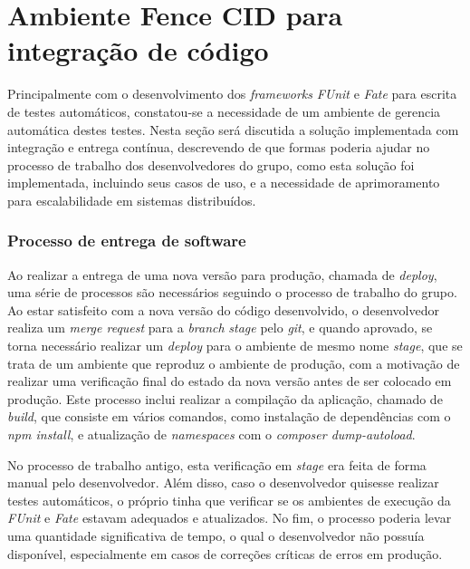 \hypertarget{fence-continuous-integration-delivery}{%
\section{Ambiente Fence CID para integração de código}\label{fence-continuous-integration-delivery}}

Principalmente com o desenvolvimento dos \emph{frameworks} \emph{FUnit} e \emph{Fate} para escrita de testes automáticos, constatou-se a necessidade de um ambiente de gerencia automática destes testes. Nesta seção será discutida a solução implementada com integração e entrega contínua, descrevendo de que formas poderia ajudar no processo de trabalho dos desenvolvedores do grupo, como esta solução foi implementada, incluindo seus casos de uso, e a necessidade de aprimoramento para escalabilidade em sistemas distribuídos.

\hypertarget{processo-de-entrega-de-software}{%
\subsubsection{\texorpdfstring{Processo de entrega de software}{Processo de entrega de software}}\label{processo-de-entrega-de-software}}

Ao realizar a entrega de uma nova versão para produção, chamada de \emph{deploy}, uma série de processos são necessários seguindo o processo de trabalho do grupo. Ao estar satisfeito com a nova versão do código desenvolvido, o desenvolvedor realiza um \emph{merge request} para a \emph{branch} \emph{stage} pelo \emph{git}, e quando aprovado, se torna necessário realizar um \emph{deploy} para o ambiente de mesmo nome \emph{stage}, que se trata de um ambiente que reproduz o ambiente de produção, com a motivação de realizar uma verificação final do estado da nova versão antes de ser colocado em produção. Este processo inclui realizar a compilação da aplicação, chamado de \emph{build}, que consiste em vários comandos, como instalação de dependências com o \emph{npm install}, e atualização de \emph{namespaces} com o \emph{composer dump-autoload}.

No processo de trabalho antigo, esta verificação em \emph{stage} era feita de forma manual pelo desenvolvedor. Além disso, caso o desenvolvedor quisesse realizar testes automáticos, o próprio tinha que verificar se os ambientes de execução da \emph{FUnit} e \emph{Fate} estavam adequados e atualizados. No fim, o processo poderia levar uma quantidade significativa de tempo, o qual o desenvolvedor não possuía disponível, especialmente em casos de correções críticas de erros em produção.

